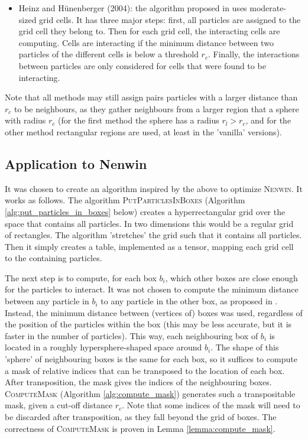 \begin{itemize}
    \item{Heinz and Hünenberger (2004)}: the algorithm proposed in \cite{heinz_pairlist_alg} uses moderate-sized grid cells. It has three major steps: first, all particles are assigned to the grid cell they belong to. Then for each grid cell, the interacting cells are computing. Cells are interacting if the minimum distance between two particles of the different cells is below a threshold $r_c$. Finally, the interactions between particles are only considered for cells that were found to be interacting.
\end{itemize}
Note that all methods may still assign pairs particles with a larger distance than $r_c$ to be neighbours, as they gather neighbours from a larger region that a sphere with radius $r_c$ (for the first method the sphere has a radius $r_l > r_c$, and for the other method rectangular regions are used, at least in the 'vanilla' versions). 

\subsection{Application to Nenwin}

It was chosen to create an algorithm inspired by the above to optimize \textsc{Nenwin}. 
It works as follows. The algorithm \textsc{PutParticlesInBoxes} (Algorithm \ref{alg:put_particles_in_boxes} below) creates a hyperrectangular grid over the space that contains all particles. In two dimensions this would be a regular grid of rectangles. The algorithm 'stretches' the grid such that it contains all particles. Then it simply creates a table, implemented as a tensor, mapping each grid cell to the containing particles. 

The next step is to compute, for each box $b_i$, which other boxes are close enough for the particles to interact. It was not chosen to compute the minimum distance between any particle in $b_i$ to any particle in the other box, as proposed in \cite{heinz_pairlist_alg}. Instead, the minimum distance between (vertices of) boxes was used, regardless of the position of the particles within the box (this may be less accurate, but it is faster in the number of particles). This way, each neighbouring box of $b_i$ is located in a roughly hypersphere-shaped space around $b_i$. The shape of this 'sphere' of neighbouring boxes is the same for each box, so it suffices to compute a mask of relative indices that can be transposed to the location of each box. After transposition, the mask gives the indices of the neighbouring boxes. \textsc{ComputeMask} (Algorithm \ref{alg:compute_mask}) generates such a transpositable mask, given a cut-off distance $r_c$. Note that some indices of the mask will need to be discarded after transposition, as they fall beyond the grid of boxes. The correctness of \textsc{ComputeMask} is proven in Lemma \ref{lemma:compute_mask}. 


